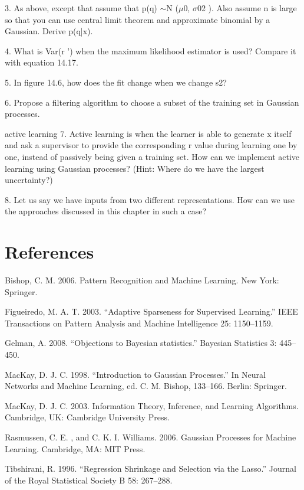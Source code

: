 3. As above, except that assume that p(q) $\sim$N ($\mu$0, $\sigma$02 ). Also assume n is large so that you can use central limit theorem and approximate binomial by a Gaussian. Derive p(q|x).

4. What is Var(r ') when the maximum likelihood estimator is used? Compare it with equation 14.17.

5. In figure 14.6, how does the fit change when we change s2?

6. Propose a filtering algorithm to choose a subset of the training set in Gaussian processes.

active learning 7. Active learning is when the learner is able to generate x itself and ask a supervisor to provide the corresponding r value during learning one by one, instead of passively being given a training set. How can we implement active learning using Gaussian processes? (Hint: Where do we have the largest uncertainty?)

8. Let us say we have inputs from two different representations. How can we use the approaches discussed in this chapter in such a case?

\section{References}

Bishop, C. M. 2006. Pattern Recognition and Machine Learning. New York: Springer.

Figueiredo, M. A. T. 2003. “Adaptive Sparseness for Supervised Learning.” IEEE Transactions on Pattern Analysis and Machine Intelligence 25: 1150--1159.

Gelman, A. 2008. “Objections to Bayesian statistics.” Bayesian Statistics 3: 445-- 450.

MacKay, D. J. C. 1998. “Introduction to Gaussian Processes.” In Neural Networks and Machine Learning, ed. C. M. Bishop, 133--166. Berlin: Springer.

MacKay, D. J. C. 2003. Information Theory, Inference, and Learning Algorithms. Cambridge, UK: Cambridge University Press.

Rasmussen, C. E. , and C. K. I. Williams. 2006. Gaussian Processes for Machine Learning. Cambridge, MA: MIT Press.

Tibshirani, R. 1996. “Regression Shrinkage and Selection via the Lasso.” Journal of the Royal Statistical Society B 58: 267--288.

